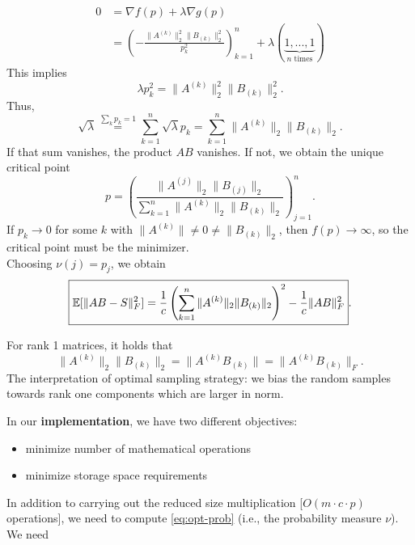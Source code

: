 \begin{equation*}
\begin{split}
0 & = \nabla f(p) + \lambda \nabla g(p) \\
& = \left(
- \frac{\|A^{(k)}\|_2^2 \|B_{(k)}\|_2^2}{p_k^2} 
\right)_{k=1}^n + \lambda (\underbrace{1,...,1}_{n \text{ times}})
\end{split}
\end{equation*}
This implies
\begin{equation*}
\lambda p_k^2 = \|A^{(k)}\|_2^2 \|B_{(k)}\|_2^2.
\end{equation*}
Thus,
$$
\sqrt{\lambda} \overset{\sum_{k}p_k=1}{=} \sum_{k=1}^n \sqrt{\lambda}p_k = \sum_{k=1}^n  \|A^{(k)}\|_2 \|B_{(k)}\|_2.
$$
If that sum vanishes, the product $AB$ vanishes. If not, we obtain the unique critical point
\begin{equation} \label{eq:opt-prob}
\boxed{
p = \left( 
\frac{\|A^{(j)}\|_2 \|B_{(j)}\|_2}{\sum_{k=1}^n \|A^{(k)}\|_2 \|B_{(k)}\|_2}
\right)_{j=1}^n
}.
\end{equation}
If $p_k \to 0$ for some $k$ with $\|A^{(k)}\|\neq 0 \neq \|B_{(k)}\|_2$, then $f(p) \to \infty$, so the critical point must be the minimizer. \\
Choosing $\nu(j) = p_j$, we obtain
\begin{equation} \label{eq:optimal-prob-error-est}
\boxed{\mathbb{E} [\|AB-S\|_F^2] = \frac{1}{c} \left( \sum_{k=1}^n \|A^{(k)}\|_2 \|B_{(k)}\|_2\right)^2- \frac{1}{c} \|AB\|_F^2}.
\end{equation}
\begin{remark*}
For rank 1 matrices, it holds that
\begin{equation}\label{eq:ident-rank-1-matr}
\boxed{\|A^{(k)}\|_2 \|B_{(k)}\|_2 = \|A^{(k)}B_{(k)}\| = \|A^{(k)}B_{(k)}\|_F}.
\end{equation}
The interpretation of optimal sampling strategy: we bias the random samples towards rank one components which are larger in norm.%
\end{remark*}
In our \textbf{implementation}, we have two different objectives: \vspace{-0.5pc}
\begin{itemize}[itemsep=0pt]
	\item minimize number of mathematical operations
	\item minimize storage space requirements
\end{itemize}
In addition to carrying out the reduced size multiplication [$O(m\cdot c \cdot p)$ operations], we need to compute \eqref{eq:opt-prob} (i.e., the probability measure $\nu$). We need
